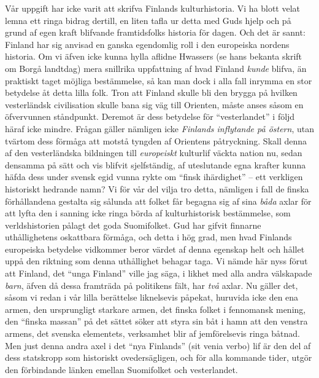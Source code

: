 Vår uppgift har icke varit att skrifva Finlands kulturhistoria. Vi ha
blott velat lemna ett ringa bidrag dertill, en liten tafla ur detta med
Guds hjelp och på grund af egen kraft blifvande framtidsfolks historia
för dagen. Och det är sannt: Finland har sig anvisad en ganska
egendomlig roll i den europeiska nordens historia. Om vi äfven icke
kunna hylla aflidne Hwassers (se hans bekanta skrift om Borgå landtdag)
mera snillrika uppfattning af hvad Finland \emph{kunde} blifva, än
praktiskt taget möjliga bestämmelse, så kan man dock i alla fall inrymma
en stor betydelse åt detta lilla folk. Tron att Finland skulle bli den
brygga på hvilken vesterländsk civilisation skulle bana sig väg till
Orienten, måste anses såsom en öfvervunnen ståndpunkt. Deremot är dess
betydelse för ``vesterlandet'' i följd häraf icke mindre. Frågan gäller
nämligen icke \emph{Finlands inflytande på östern}, utan tvärtom dess
förmåga att motstå tyngden af Orientens påtryckning. Skall denna af den
vesterländska bildningen till \emph{europeiskt} kulturlif väckta nation
nu, sedan densamma på sätt och vis blifvit sjelfständig, af uteslutande
egna krafter kunna häfda dess under svensk egid vunna rykte om ``finsk
ihärdighet'' -- ett verkligen historiskt hedrande namn? Vi för vår del
vilja tro detta, nämligen i fall de finska förhållandena gestalta sig
sålunda att folket får begagna sig af sina \emph{båda} axlar för att
lyfta den i sanning icke ringa börda af kulturhistorisk bestämmelse, som
verldshistorien pålagt det goda Suomifolket. Gud har gifvit finnarne
uthållighetens oskattbara förmåga, och detta i hög grad, men hvad
Finlands europeiska betydelse vidkommer beror värdet af denna egenskap
helt och hållet uppå den riktning som denna uthållighet behagar taga. Vi
nämde här nyss förut att Finland, det ``unga Finland'' ville jag säga, i
likhet med alla andra välskapade \emph{barn}, äfven då dessa framträda
på politikens fält, har \emph{två} axlar. Nu gäller det, såsom vi redan
i vår lilla berättelse liknelsevis påpekat, huruvida icke den ena armen,
den ursprungligt starkare armen, det finska folket i fennomansk mening,
den ``finska massan'' på det sättet söker att styra sin båt i hamn att
den venstra armens, det svenska elementets, verksamhet blir af
jemförelsevis ringa båtnad. Men just denna andra axel i det ``nya
Finlands'' (sit venia verbo) lif är den del af dess statskropp som
historiskt ovedersägligen, och för alla kommande tider, utgör den
förbindande länken emellan Suomifolket och vesterlandet.

